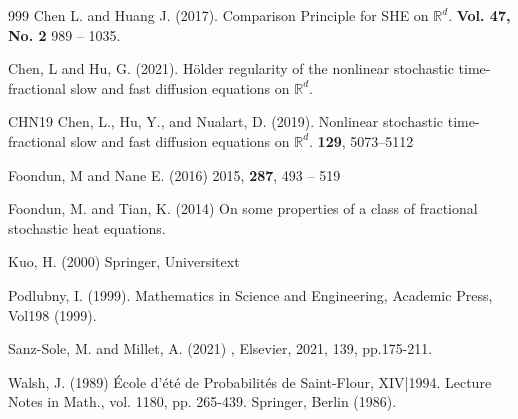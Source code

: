 \documentclass[a4paper,11pt]{article}
\numberwithin{equation}{section}
\theoremstyle{plain}
\theoremstyle{definition}
\newcommand{\R}{\mathbb{R}}
\numberwithin{NQ}{section}
\numberwithin{LQ}{section}
\numberwithin{ZQ}{section}
\begin{document}
	\begin{thebibliography}{999}
		Chen L. and Huang J. (2017).
		\newblock Comparison Principle for SHE on $\R^d$.
		 \textbf{Vol. 47, No. 2} 989 -- 1035.
		
		Chen, L and Hu, G. (2021).
		\newblock H\"older regularity of the nonlinear stochastic time-fractional slow and fast diffusion equations on $\R^d$.
		
		{CHN19}%
		Chen, L., Hu, Y., and Nualart, D. (2019).
		\newblock Nonlinear stochastic time-fractional slow and fast diffusion equations on $\R^d$.
		 \textbf{129}, 5073--5112
		
		Foondun, M and Nane E. (2016)
		 2015, \textbf{287}, 493 -- 519
		
		Foondun, M. and Tian, K. (2014)
		\newblock On some properties of a class of fractional stochastic heat equations.
		
		Kuo, H. (2000)
		\newblock Springer, Universitext
		
		Podlubny, I. (1999).
		\newblock Mathematics in Science and Engineering, Academic Press, Vol198 (1999).
		
		Sanz-Sole, M. and Millet, A. (2021)
		, Elsevier, 2021, 139, pp.175-211.
		
		Walsh, J. (1989)
		\newblock \'Ecole d'\'et\'e de Probabilit\'es de Saint-Flour, XIV|1994. Lecture Notes in Math., vol. 1180, pp. 265-439. Springer, Berlin (1986).
	\end{thebibliography}
	
\end{document}
